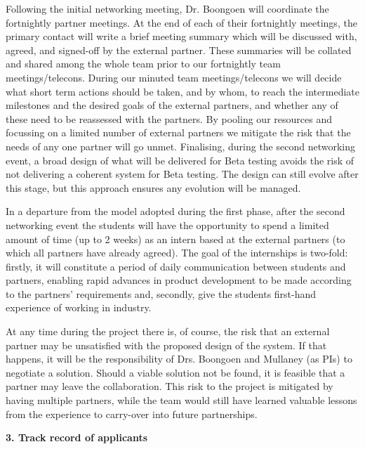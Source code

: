 \documentclass[11pt]{article}
\begin{document}
  \vspace{2mm}
  \noindent
  Following the initial networking meeting, Dr. Boongoen will coordinate the fortnightly partner meetings. At the end of each of their fortnightly meetings, the primary contact will write a brief meeting summary which will be discussed with, agreed, and signed-off by the external partner. These summaries will be collated and shared among the whole team prior to our fortnightly team meetings/telecons. During our minuted team meetings/telecons we will decide what short term actions should be taken, and by whom, to reach the intermediate milestones and the desired goals of the external partners, and whether any of these need to be reassessed with the partners. By pooling our resources and focussing on a limited number of external partners we mitigate the risk that the needs of any one partner will go unmet. Finalising, during the second networking event, a broad design of what will be delivered for Beta testing avoids the risk of not delivering a coherent system for Beta testing. The design can still evolve after this stage, but this approach ensures any evolution will be managed. 
  
  \vspace{2mm}
  \noindent
  In a departure from the model adopted during the first phase, after the second networking event the students will have the opportunity to spend a limited amount of time (up to 2 weeks) as an intern based at the external partners (to which all partners have already agreed). The goal of the internships is two-fold: firstly, it will constitute a period of daily communication between students and partners, enabling rapid advances in product development to be made according to the partners' requirements and, secondly, give the students first-hand experience of working in industry.

  \vspace{2mm}
  \noindent
  At any time during the project there is, of course, the risk that an external partner may be unsatisfied with the proposed design of the system. If that happens, it will be the responsibility of Drs. Boongoen and Mullaney (as PIs) to negotiate a solution. Should a viable solution not be found, it is feasible that a partner may leave the collaboration. This risk to the project is mitigated by having multiple partners, while the team would still have learned valuable lessons from the experience to carry-over into future partnerships.
    
  \pagebreak
  \noindent
  {\large \bf 3. Track record of applicants}
  
\end{document}
